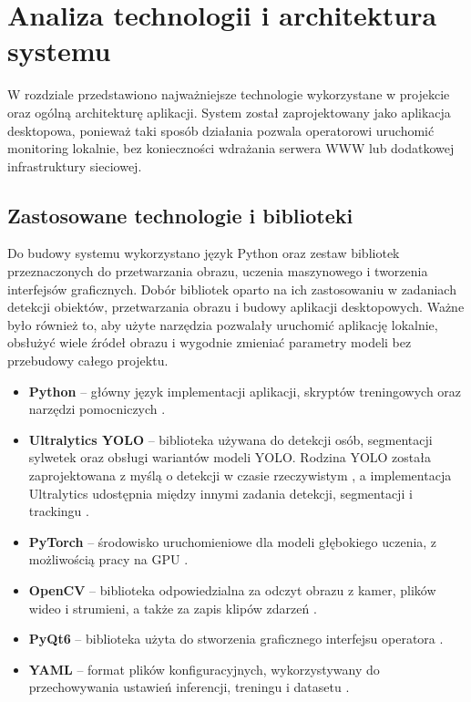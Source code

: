 \clearpage
\section{Analiza technologii i architektura systemu}		%

W rozdziale przedstawiono najważniejsze technologie wykorzystane w projekcie oraz ogólną architekturę aplikacji. System został zaprojektowany jako aplikacja desktopowa, ponieważ taki sposób działania pozwala operatorowi uruchomić monitoring lokalnie, bez konieczności wdrażania serwera WWW lub dodatkowej infrastruktury sieciowej.

\subsection{Zastosowane technologie i biblioteki}

Do budowy systemu wykorzystano język Python oraz zestaw bibliotek przeznaczonych do przetwarzania obrazu, uczenia maszynowego i tworzenia interfejsów graficznych. Dobór bibliotek oparto na ich zastosowaniu w zadaniach detekcji obiektów, przetwarzania obrazu i budowy aplikacji desktopowych. Ważne było również to, aby użyte narzędzia pozwalały uruchomić aplikację lokalnie, obsłużyć wiele źródeł obrazu i wygodnie zmieniać parametry modeli bez przebudowy całego projektu.

\begin{itemize}
\item \textbf{Python} -- główny język implementacji aplikacji, skryptów treningowych oraz narzędzi pomocniczych \cite{pythondocs}.
\item \textbf{Ultralytics YOLO} -- biblioteka używana do detekcji osób, segmentacji sylwetek oraz obsługi wariantów modeli YOLO. Rodzina YOLO została zaprojektowana z myślą o detekcji w czasie rzeczywistym \cite{redmon2016yolo}, a implementacja Ultralytics udostępnia między innymi zadania detekcji, segmentacji i trackingu \cite{ultralyticsdocs}.
\item \textbf{PyTorch} -- środowisko uruchomieniowe dla modeli głębokiego uczenia, z możliwością pracy na GPU \cite{paszke2019pytorch,pytorchdocs}.
\item \textbf{OpenCV} -- biblioteka odpowiedzialna za odczyt obrazu z kamer, plików wideo i strumieni, a także za zapis klipów zdarzeń \cite{opencvdocs}.
\item \textbf{PyQt6} -- biblioteka użyta do stworzenia graficznego interfejsu operatora \cite{pyqtdocs}.
\item \textbf{YAML} -- format plików konfiguracyjnych, wykorzystywany do przechowywania ustawień inferencji, treningu i datasetu \cite{yamlspec}.
\end{itemize}

